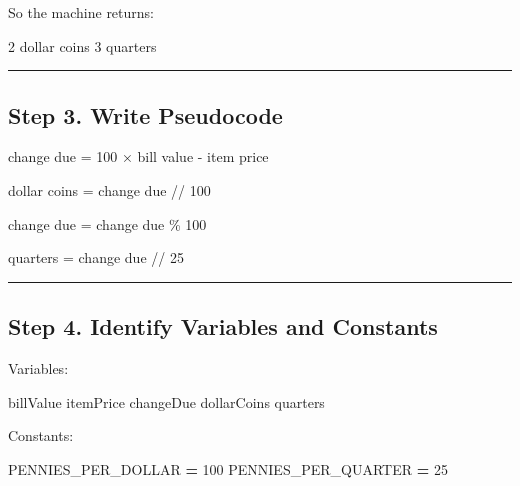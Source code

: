 \documentclass[
]{article}
\newenvironment{Shaded}{\begin{snugshade}}{\end{snugshade}}
\newcommand{\DecValTok}[1]{\textcolor[rgb]{0.00,0.00,0.81}{#1}}
\newcommand{\NormalTok}[1]{#1}
\newcommand{\OperatorTok}[1]{\textcolor[rgb]{0.81,0.36,0.00}{\textbf{#1}}}
\begin{document}
So the machine returns:

\begin{Shaded}
\begin{Highlighting}[]
\NormalTok{2 dollar coins}
\NormalTok{3 quarters}
\end{Highlighting}
\end{Shaded}

\begin{center}\rule{0.5\linewidth}{0.5pt}\end{center}

\subsection{Step 3. Write Pseudocode}\label{step-3.-write-pseudocode}

\begin{Shaded}
\begin{Highlighting}[]
\NormalTok{change due = 100 × bill value {-} item price}

\NormalTok{dollar coins = change due // 100}

\NormalTok{change due = change due \% 100}

\NormalTok{quarters = change due // 25}
\end{Highlighting}
\end{Shaded}

\begin{center}\rule{0.5\linewidth}{0.5pt}\end{center}

\subsection{Step 4. Identify Variables and
Constants}\label{step-4.-identify-variables-and-constants}

Variables:

\begin{Shaded}
\begin{Highlighting}[]
\NormalTok{billValue}
\NormalTok{itemPrice}
\NormalTok{changeDue}
\NormalTok{dollarCoins}
\NormalTok{quarters}
\end{Highlighting}
\end{Shaded}

Constants:

\begin{Shaded}
\begin{Highlighting}[]
\NormalTok{PENNIES\_PER\_DOLLAR }\OperatorTok{=} \DecValTok{100}
\NormalTok{PENNIES\_PER\_QUARTER }\OperatorTok{=} \DecValTok{25}
\end{Highlighting}
\end{Shaded}
\end{document}
